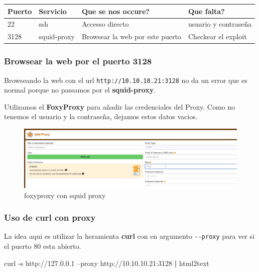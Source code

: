 \documentclass{assets/ipesethesis}
\newenvironment{Shaded}{\begin{snugshade}}{\end{snugshade}}
\newcommand{\ExtensionTok}[1]{#1}
\newcommand{\KeywordTok}[1]{\textcolor[rgb]{0.13,0.29,0.53}{\textbf{#1}}}
\newcommand{\NormalTok}[1]{#1}
\begin{document}
\begin{longtable}[]{@{}llll@{}}
\toprule
Puerto & Servicio & Que se nos occure? & Que falta?\tabularnewline
\midrule
\endhead
22 & ssh & Accesso directo & usuario y contraseña\tabularnewline
3128 & squid-proxy & Browsear la web por este puerto & Checkear el exploit\tabularnewline
\bottomrule
\end{longtable}

\hypertarget{browsear-la-web-por-el-puerto-3128}{%
\subsubsection*{Browsear la web por el puerto 3128}\label{browsear-la-web-por-el-puerto-3128}}

Browseando la web con el url \texttt{http://10.10.10.21:3128} no da un error que es normal porque no passamos por el \textbf{squid-proxy}.

Utilizamos el \textbf{FoxyProxy} para añadir las credenciales del Proxy. Como no tenemos el usuario y la contraseña, dejamos estos datos
vacios.

\begin{figure}
\includegraphics[width=0.9\linewidth]{images/squid-foxy-no-creds} \caption{foxyproxy con squid proxy}\label{fig:unnamed-chunk-5}
\end{figure}

\hypertarget{uso-de-curl-con-proxy}{%
\subsubsection*{Uso de curl con proxy}\label{uso-de-curl-con-proxy}}

La idea aqui es utilizar la heramienta \textbf{curl} con en argumento \texttt{-\/-proxy} para ver si el puerto 80 esta abierto.

\begin{Shaded}
\begin{Highlighting}[]
\ExtensionTok{curl}\NormalTok{ -s http://127.0.0.1 --proxy http://10.10.10.21:3128 }\KeywordTok{|} \ExtensionTok{html2text}
\end{Highlighting}
\end{Shaded}
\end{document}
